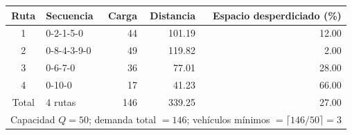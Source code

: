 \begin{tabular}{clrrr}
\toprule
Ruta & Secuencia & Carga & Distancia & Espacio desperdiciado (\%) \\
\midrule
1 & 0-2-1-5-0 & 44 & 101.19 & 12.00 \\
2 & 0-8-4-3-9-0 & 49 & 119.82 & 2.00 \\
3 & 0-6-7-0 & 36 & 77.01 & 28.00 \\
4 & 0-10-0 & 17 & 41.23 & 66.00 \\
\midrule
Total & 4 rutas & 146 & 339.25 & 27.00 \\
\midrule
\multicolumn{5}{l}{Capacidad $Q=50$; demanda total $=146$; vehículos mínimos $=\lceil 146/50 \rceil = 3$} \\
\bottomrule
\end{tabular}
